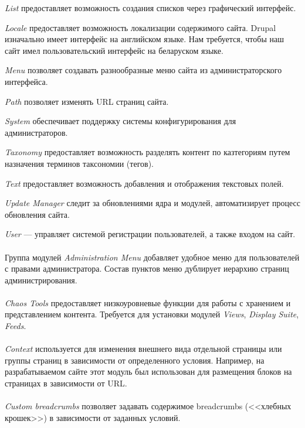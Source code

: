 \textit{List} предоставляет возможность создания списков через графический интерфейс.

\textit{Locale} предоставляет возможность локализации содержимого сайта.
Drupal изначально имеет интерфейс на английском языке. 
Нам требуется, чтобы наш сайт имел пользовательский интерфейс на беларуском языке.

\textit{Menu} позволяет создавать разнообразные меню сайта из администраторского интерфейса.

\textit{Path} позволяет изменять URL страниц сайта.

\textit{System} обеспечивает поддержку системы конфигурирования
для администраторов.

\textit{Taxonomy} предоставляет возможность разделять контент по казтегориям 
путем назначения терминов таксономии (тегов).

\textit{Text} предоставляет возможность добавления и отображения текстовых полей.

\textit{Update Manager} следит за обновлениями ядра и модулей,
автоматизирует процесс обновления сайта.

\textit{User} --- управляет системой регистрации пользователей, а также входом на сайт.

\paragraph{}
Группа модулей \textit{Administration Menu} добавляет удобное меню для
пользователей с правами администратора.
Состав пунктов меню дублирует иерархию страниц администрирования.

\paragraph{}
\textit{Chaos Tools} предоставляет низкоуровневые функции для работы с хранением и 
представлением контента. Требуется для установки модулей \textit{Views},
\textit{Display Suite}, \textit{Feeds}.

\paragraph{}
\textit{Context} используется для изменения внешнего вида отдельной страницы или 
группы страниц в зависимости от определенного условия.
Например, на разрабатываемом сайте этот модуль был использован для размещения блоков
на страницах в зависимости от URL.
  
\paragraph{}
\textit{Custom breadcrumbs} позволяет задавать содержимое breadcrumbs (<<хлебных крошек>>) 
в зависимости от заданных условий.

